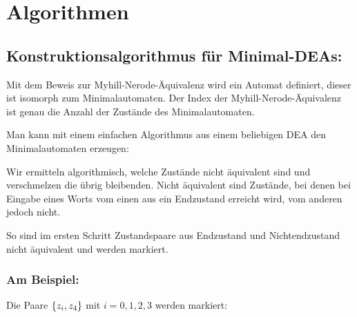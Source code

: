 \chapter{Algorithmen}
\section{Konstruktionsalgorithmus für Minimal-DEAs:}
Mit dem Beweis zur Myhill-Nerode-Äquivalenz wird ein Automat definiert, dieser ist isomorph zum Minimalautomaten.
Der Index der Myhill-Nerode-Äquivalenz ist genau die Anzahl der Zustände des Minimalautomaten.

Man kann mit einem einfachen Algorithmus aus einem beliebigen DEA den Minimalautomaten erzeugen:

Wir ermitteln algorithmisch, welche Zustände nicht äquivalent sind und verschmelzen die übrig bleibenden.
Nicht äquivalent sind Zustände, bei denen bei Eingabe eines Worts vom einen aus ein Endzustand erreicht wird, vom anderen jedoch nicht.

So sind im ersten Schritt Zustandspaare aus Endzustand und Nichtendzustand nicht äquivalent und werden markiert.

\subsection*{Am Beispiel:}

\vspace{1em}


Die Paare $\left\{ z_i,z_4 \right\}$ mit $i=0,1,2,3$ werden markiert:

